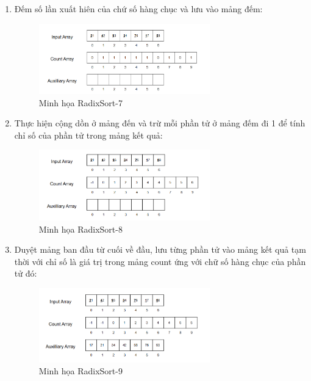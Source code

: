 \begin{enumerate}
    \item Đếm số lần xuất hiên của chứ số hàng chục và lưu vào mảng đếm:
    \begin{figure}[H]
        \centering
        \includegraphics[width=0.7\textwidth]{img/radix_sort/7.png}
        \caption{Minh họa RadixSort-7}
    \end{figure}
    
    \item Thực hiện cộng dồn ở mảng đến và trừ mỗi phần tử ở mảng đếm đi 1 để tính chỉ số của phần tử trong mảng kết quả:
    \begin{figure}[H]
        \centering
        \includegraphics[width=0.7\textwidth]{img/radix_sort/8.png}
        \caption{Minh họa RadixSort-8}
    \end{figure}
    
    \item Duyệt mảng ban đầu từ cuối về đầu, lưu từng phần tử vào mảng kết quả tạm thời với chỉ số là giá trị trong mảng count ứng với chữ số hàng chục của phần tử đó:
    \begin{figure}[H]
        \centering
        \includegraphics[width=0.7\textwidth]{img/radix_sort/9.png}
        \caption{Minh họa RadixSort-9}
    \end{figure}
    

\end{enumerate}

